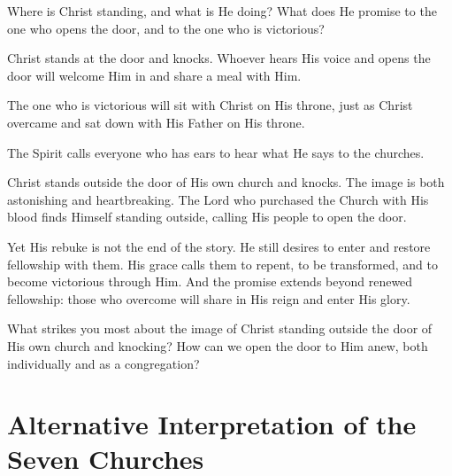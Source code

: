 \begin{ScriptureBox2}{Where is Christ standing, and what is He doing? What does He promise to the one who opens the door, and to the one who is victorious?}
\item[3:20] Christ stands at the door and knocks. Whoever hears His voice and opens the door will welcome Him in and share a meal with Him.

\item[3:21] The one who is victorious will sit with Christ on His throne, just as Christ overcame and sat down with His Father on His throne.

\item[3:22] The Spirit calls everyone who has ears to hear what He says to the churches.
\end{ScriptureBox2}

Christ stands outside the door of His own church and knocks. The image is both astonishing and heartbreaking. The Lord who purchased the Church with His blood finds Himself standing outside, calling His people to open the door.

Yet His rebuke is not the end of the story. He still desires to enter and restore fellowship with them. His grace calls them to repent, to be transformed, and to become victorious through Him. And the promise extends beyond renewed fellowship: those who overcome will share in His reign and enter His glory.

\begin{ReaderQuestion}
What strikes you most about the image of Christ standing outside the door of His own church and knocking? How can we open the door to Him anew, both individually and as a congregation?
\end{ReaderQuestion}
\section{Alternative Interpretation of the Seven Churches}

